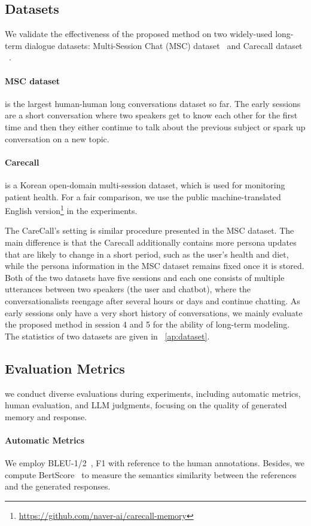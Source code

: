 \documentclass[authoryear,preprint,review,12pt]{elsarticle}
\begin{document}
\subsection{Datasets}
We validate the effectiveness of the proposed method on two widely-used long-term dialogue datasets: Multi-Session Chat (MSC) dataset~\citep{xu-etal-2022-beyond} and Carecall dataset ~\citep{bae-etal-2022-keep}. \paragraph{MSC dataset} is the largest human-human long conversations dataset so far. The early sessions are a short conversation where two
speakers get to know each other for the first time and then they either continue to talk about the previous subject or spark up conversation on a new topic. \paragraph{Carecall} is a Korean open-domain multi-session dataset, which is used for monitoring patient health. For a fair comparison, we use the public machine-translated English version\footnote{\url{https://github.com/naver-ai/carecall-memory}} in the experiments. 

The CareCall's setting is similar procedure presented in the MSC dataset. 
The main difference is that the Carecall additionally contains more persona updates that are likely to change in a short period, such as the user's health and diet, while the persona information in the MSC dataset remains fixed once it is stored. Both of the two datasets have five sessions and each one consists of multiple utterances between two speakers (the user and chatbot), where the conversationalists reengage after several hours or days and continue chatting. As early sessions only have a very short history of conversations, we mainly evaluate the proposed method in session 4 and 5 for the ability of long-term modeling. The statistics of two datasets are given in ~\ref{ap:dataset}. 

\subsection{Evaluation Metrics}
we conduct diverse evaluations during experiments, including automatic metrics, human evaluation, and LLM judgments, focusing on the quality of generated memory and response. 
\paragraph*{Automatic Metrics}
We employ BLEU-1/2~\citep{BLEUAMethod}, F1 with reference to the human annotations. Besides, we compute BertScore~\citep{li-etal-2016-diversity} to measure the semantics similarity between the references and the generated responses. 
\end{document}
